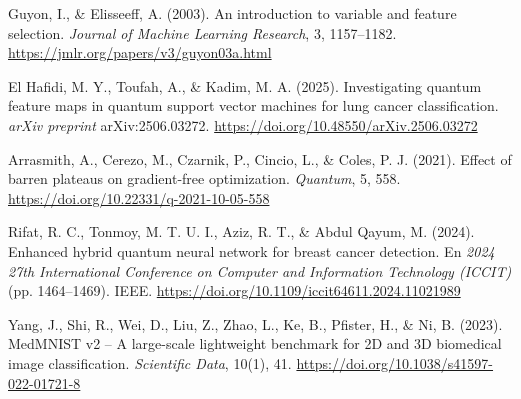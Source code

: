     Guyon, I., \& Elisseeff, A. (2003).
    An introduction to variable and feature selection.
    \textit{Journal of Machine Learning Research}, 3, 1157--1182.
    \url{https://jmlr.org/papers/v3/guyon03a.html}

    El Hafidi, M. Y., Toufah, A., \& Kadim, M. A. (2025).
    Investigating quantum feature maps in quantum support vector machines for lung cancer classification.
    \textit{arXiv preprint} arXiv:2506.03272.
    \url{https://doi.org/10.48550/arXiv.2506.03272}

    Arrasmith, A., Cerezo, M., Czarnik, P., Cincio, L., \& Coles, P. J. (2021).
    Effect of barren plateaus on gradient-free optimization.
    \textit{Quantum}, 5, 558.
    \url{https://doi.org/10.22331/q-2021-10-05-558}

    Rifat, R. C., Tonmoy, M. T. U. I., Aziz, R. T., \& Abdul Qayum, M. (2024).
    Enhanced hybrid quantum neural network for breast cancer detection.
    En \textit{2024 27th International Conference on Computer and Information Technology (ICCIT)} (pp. 1464--1469). IEEE.
    \url{https://doi.org/10.1109/iccit64611.2024.11021989}

    Yang, J., Shi, R., Wei, D., Liu, Z., Zhao, L., Ke, B., Pfister, H., \& Ni, B. (2023).
    MedMNIST v2 -- A large-scale lightweight benchmark for 2D and 3D biomedical image classification.
    \textit{Scientific Data}, 10(1), 41.
    \url{https://doi.org/10.1038/s41597-022-01721-8}

